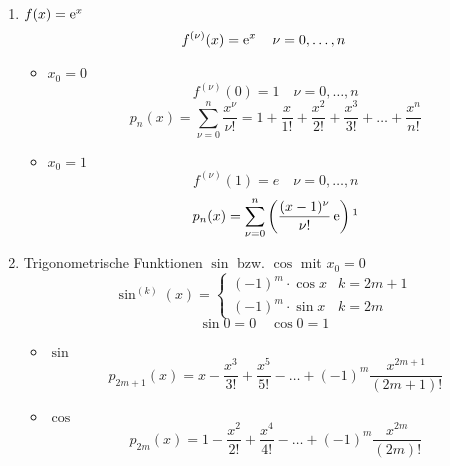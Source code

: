\begin{example}
  \begin{enumerate}
    \item $f(x) = \operatorname{e}^x$
      \[ f^{(\nu)}(x) = \operatorname{e}^x \quad \nu = 0, \ldots, n \]
      \begin{itemize}
        \item $x_0 = 0$
          \[ f^{(\nu)}(0) = 1 \quad \nu = 0, \ldots, n \]
          \[ p_n(x) = \sum_{\nu = 0}^n \frac{x^\nu}{\nu !} = 1 + \frac x {1!} + \frac{x^2}{2!} + \frac{x^3}{3!} + \ldots + \frac{x^n}{n!} \]

          \begin{center}
          \end{center}

        \item $x_0 = 1$
          \[ f^{(\nu)}(1) = e \quad \nu = 0, \ldots, n \]
          \[ p_n(x) = \sum_{\nu = 0}^n \left( \frac{(x-1)^\nu}{\nu !} \euler \right)\annotation{\text{für $x = 1$ und $\nu = 0$ ist der Zähler $(1-1)^0 = 0^0 = 1$}} \]
      \end{itemize}
    \item Trigonometrische Funktionen $\sin$ bzw. $\cos$ mit $x_0 = 0$
      \[ \sin^{(k)}(x) = 
        \begin{cases}
          (-1)^m \cdot \cos x & k = 2m+1 \\
          (-1)^m \cdot \sin x & k = 2m
        \end{cases}
      \]
      \[ \sin 0 = 0 \quad \cos 0 = 1 \]
      \begin{itemize}
        \item $\sin$
          \[ p_{2m+1}(x) = x - \frac{x^3}{3!} + \frac{x^5}{5!} - \ldots + (-1)^m \frac{x^{2m+1}}{(2m+1)!} \]
        \item $\cos$
          \[ p_{2m}(x) = 1 - \frac{x^2}{2!} + \frac{x^4}{4!} - \ldots + (-1)^m \frac{x^{2m}}{(2m)!} \]
      \end{itemize}
  \end{enumerate}
\end{example}

